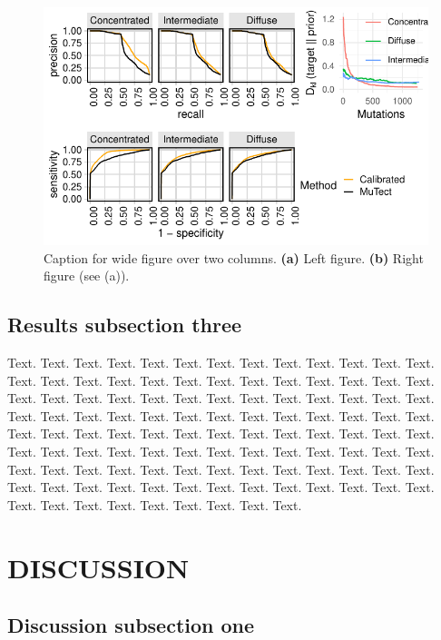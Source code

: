 \documentclass[a4,center,fleqn]{NAR}
\begin{document}
\begin{figure}[t]
\begin{center}
\includegraphics{figures/fig1.pdf}
\end{center}
\caption{Caption for wide figure over two columns.
\textbf{(a)} Left figure.
\textbf{(b)} Right figure (see (a)).
}
\label{NAR-fig2}
\end{figure}


\subsection{Results subsection three}

Text. Text. Text. Text. Text. Text. Text. Text. Text. Text. Text.
Text. Text. Text. Text. Text. Text. Text. Text. Text. Text. Text.
Text. Text. Text. Text. Text. Text. Text. Text. Text. Text. Text.
Text. Text. Text. Text. Text. Text. Text. Text. Text. Text. Text.
Text. Text. Text. Text. Text. Text. Text. Text. Text. Text. Text.
Text. Text. Text. Text. Text. Text. Text. Text. Text. Text. Text.
Text. Text. Text. Text. Text. Text. Text. Text. Text. Text. Text.
Text. Text. Text. Text. Text. Text. Text. Text. Text. Text. Text.
Text. Text. Text. Text. Text. Text. Text. Text. Text. Text. Text.
Text. Text. Text. Text. Text. Text. Text. Text. Text. Text. Text.
Text. Text. Text.


\section{DISCUSSION}

\subsection{Discussion subsection one}
\end{document}
